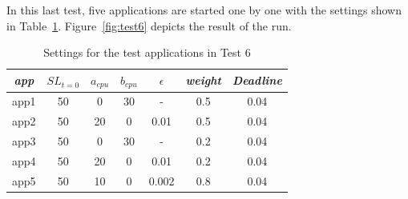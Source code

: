 \documentclass[nobiblatex]{LTHthesis}
\begin{document}
In this last test, five applications are started one by one with the 
settings shown in Table~\ref{tab:settings_test6}. Figure~\ref{fig:test6}
depicts the result of the run.

\begin{table}[h]
  \centering
  \begin{tabular}{|c|c|c|c|c|c|c|}
  \hline 
   \emph{app} & $SL_{t=0}$ & \textbf{$a_{cpu}$} & 
   \textbf{$b_{cpu}$} & \textbf{$\epsilon$} & 
   \emph{weight} & \emph{Deadline} \\ \hline
  app1 & 50 & 0  & 30 & -	 & 0.5 &0.04  \\ \hline
  app2 & 50 & 20 & 0  & 0.01  & 0.5 &0.04  \\ \hline
  app3 & 50 & 0  & 30 & -	 & 0.2 &0.04  \\ \hline
  app4 & 50 & 20 & 0  & 0.01  & 0.2 &0.04  \\ \hline
  app5 & 50 & 10 & 0  & 0.002 & 0.8 &0.04  \\ \hline				
  \end{tabular}
  \caption{Settings for the test applications in Test 6}
  \label{tab:settings_test6}
\end{table}
\end{document}
